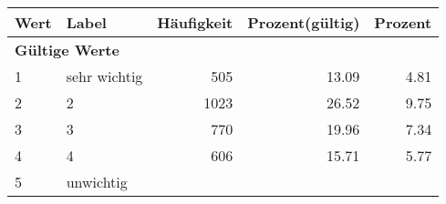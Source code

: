      \begin{longtable}{lXrrr}
     \toprule
     \textbf{Wert} & \textbf{Label} & \textbf{Häufigkeit} & \textbf{Prozent(gültig)} & \textbf{Prozent} \\
     \endhead
     \midrule
     \multicolumn{5}{l}{\textbf{Gültige Werte}}\\

     1 &
     \multicolumn{1}{X}{ sehr wichtig   } &


       \num{505} &
       \num[round-mode=places,round-precision=2]{13,09} &
         \num[round-mode=places,round-precision=2]{4,81} \\

     2 &
     \multicolumn{1}{X}{ 2   } &


       \num{1023} &
       \num[round-mode=places,round-precision=2]{26,52} &
         \num[round-mode=places,round-precision=2]{9,75} \\

     3 &
     \multicolumn{1}{X}{ 3   } &


       \num{770} &
       \num[round-mode=places,round-precision=2]{19,96} &
         \num[round-mode=places,round-precision=2]{7,34} \\

     4 &
     \multicolumn{1}{X}{ 4   } &


       \num{606} &
       \num[round-mode=places,round-precision=2]{15,71} &
         \num[round-mode=places,round-precision=2]{5,77} \\

     5 &
     \multicolumn{1}{X}{ unwichtig   } &



\end{longtable}
